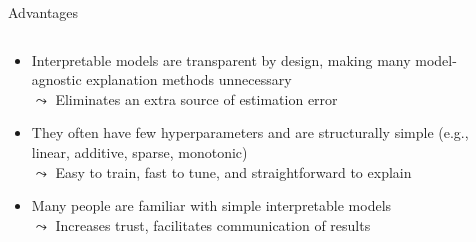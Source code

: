 \documentclass[11pt,compress,t,notes=noshow, aspectratio=169, xcolor=table]{beamer}
\begin{document}
\begin{frame}{Advantages}
\begin{columns}[T, totalwidth=\textwidth]
\begin{column}{0.75\textwidth}
    \begin{itemize}[<+->]
    \itemsep1em
        \item Interpretable models are transparent by design, making many model-agnostic explanation methods unnecessary\\
        $\leadsto$ Eliminates an extra source of estimation error
        \item They often have few hyperparameters and are structurally simple (e.g., linear, additive, sparse, monotonic)\\
$\leadsto$ Easy to train, fast to tune, and straightforward to explain
        \item Many people are familiar with simple interpretable models \\
        $\leadsto$ Increases trust, facilitates communication of results
    \end{itemize}
\end{column}
\begin{column}{0.25\textwidth}
    \begin{center}
\end{center}
\end{column}
\end{columns}
\end{frame}
\end{document}
